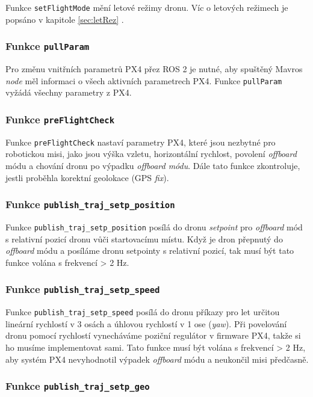 Funkce \texttt{setFlightMode} mění letové režimy dronu. Víc o letových režimech je popsáno v kapitole \ref{sec:letRez} .

\subsubsection{Funkce \texttt{pullParam}}

Pro změnu vnitřních parametrů PX4 přez ROS 2 je nutné, aby spuštěný Mavros \textit{node} měl informaci o všech aktivních parametrech PX4. Funkce \texttt{pullParam} vyžádá všechny parametry z PX4.

\subsubsection{Funkce \texttt{preFlightCheck}}

Funkce \texttt{preFlightCheck} nastaví parametry PX4, které jsou nezbytné pro robotickou misi, jako jsou výška vzletu, horizontální rychlost, povolení \textit{offboard} módu a chování dronu po výpadku \textit{offboard módu}. Dále tato funkce zkontroluje, jestli proběhla korektní geolokace (GPS \textit{fix}).

\subsubsection{Funkce \texttt{publish\_traj\_setp\_position}}

Funkce \texttt{publish\_traj\_setp\_position} posílá do dronu \textit{setpoint} pro \textit{offboard} mód s relativní pozicí dronu vůči startovacímu místu. Když je dron přepnutý do \textit{offboard} módu a posíláme dronu setpointy s relativní pozicí, tak musí být tato funkce volána s frekvencí > 2 Hz.

\subsubsection{Funkce \texttt{publish\_traj\_setp\_speed}}

Funkce \texttt{publish\_traj\_setp\_speed} posílá do dronu příkazy pro let určitou lineární rychlostí v 3 osách a úhlovou rychlostí v 1 ose (\textit{yaw}). Při povelování dronu pomocí rychlostí vynecháváme poziční regulátor v firmware PX4, takže si ho musíme implementovat sami. Tato funkce musí být volána s frekvencí > 2 Hz, aby systém PX4 nevyhodnotil výpadek \textit{offboard} módu a neukončil misi předčasně.

\subsubsection{Funkce \texttt{publish\_traj\_setp\_geo}}

